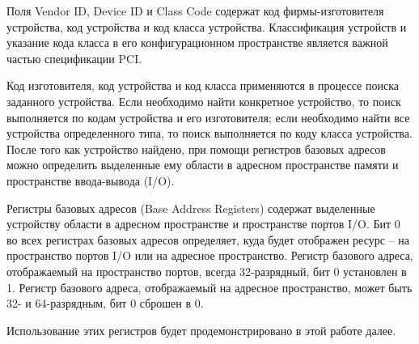 Поля Vendor ID, Device ID и Class Code содержат код фирмы-изготовителя устройства, код устройства и код класса устройства. Классификация устройств и указание кода класса в его конфигурационном пространстве является важной частью спецификации PCI\cite{Cragon}.

Код изготовителя, код устройства и код класса применяются в процессе поиска заданного устройства. Если необходимо найти конкретное устройство, то поиск выполняется по кодам устройства и его изготовителя; если необходимо найти все устройства определенного типа, то поиск выполняется по коду класса устройства. После того как устройство найдено, при помощи регистров базовых адресов можно определить выделенные ему области в адресном пространстве памяти и пространстве ввода-вывода (I/O).

Регистры базовых адресов (Base Address Registers) содержат выделенные устройству области в адресном пространстве и пространстве портов I/O. Бит 0 во всех регистрах базовых адресов определяет, куда будет отображен ресурс – на пространство портов I/O или на адресное пространство. Регистр базового адреса, отображаемый на пространство портов, всегда 32-разрядный, бит 0 установлен в 1. Регистр базового адреса, отображаемый на адресное пространство, может быть 32- и 64-разрядным, бит 0 сброшен в 0.

Использование этих регистров будет продемонстрировано в этой работе далее.